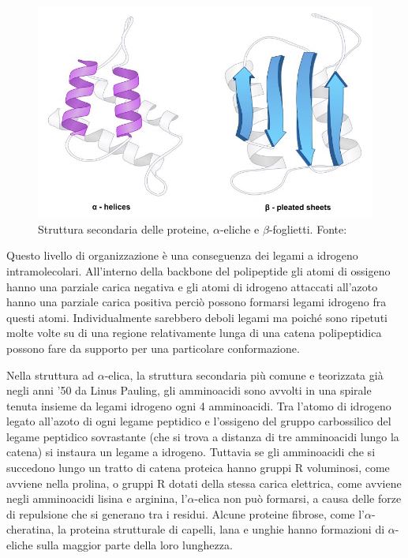 {{\begin{figure}[h]
	\centering
	\includegraphics[scale=0.4]{images/secondary.jpeg}
	\caption{Struttura secondaria delle proteine, $\alpha$-eliche e $\beta$-foglietti. Fonte: \cite{proteinStrucBioNinja}}
	\label{fig:struttura-secondaria}
\end{figure}

Questo livello di organizzazione è una conseguenza dei legami a idrogeno intramolecolari. All'interno della backbone del polipeptide gli atomi di ossigeno hanno una parziale carica negativa e gli atomi di idrogeno attaccati all'azoto hanno una parziale carica positiva perciò possono formarsi legami idrogeno fra questi atomi. Individualmente sarebbero deboli legami ma poiché sono ripetuti molte volte su di una regione relativamente lunga di una catena polipeptidica possono fare da supporto per una particolare conformazione.

\par Nella struttura ad $\alpha$-elica, la struttura secondaria più comune e teorizzata già negli anni '50 da Linus Pauling, gli amminoacidi sono avvolti in una spirale tenuta insieme da legami idrogeno ogni 4 amminoacidi. Tra l’atomo di idrogeno legato all’azoto di ogni legame peptidico e l’ossigeno del gruppo carbossilico del legame peptidico sovrastante (che si trova a distanza di tre amminoacidi lungo la catena) si instaura un legame a idrogeno. Tuttavia se gli amminoacidi che si succedono lungo un tratto di catena proteica hanno gruppi R voluminosi, come avviene nella prolina, o gruppi R dotati della stessa carica elettrica, come avviene negli amminoacidi lisina e arginina, l’$\alpha$-elica non può formarsi, a causa delle forze di repulsione che si generano tra i residui. Alcune proteine fibrose, come l'$\alpha$-cheratina, la proteina strutturale di capelli, lana e unghie hanno formazioni di $\alpha$-eliche sulla maggior parte della loro lunghezza.

}}
